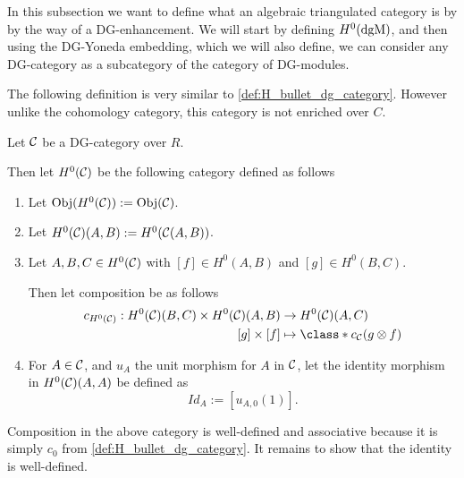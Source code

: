 In this subsection we want to define what an algebraic triangulated category is by by the way of a DG-enhancement. We will start by defining \( H^0(\operatorname{dgM}) \), and then using the DG-Yoneda embedding, which we will also define, we can consider any DG-category as a subcategory of the category of DG-modules.

The following definition is very similar to \autoref{def:H_bullet_dg_category}. However unlike the cohomology category, this category is not enriched over \( C \).

\begin{definition}
    \label{def:0_th_cohomology_of_dg_cat}
    Let \( {\mathcal{C}} \) be a DG-category over \( R \).

    Then let \( H^0({\mathcal{C}}) \) be the following category defined as follows
    \begin{enumerate}
        \item {
            Let \( \operatorname{Obj}(H^0({\mathcal{C}})) := \operatorname{Obj}({\mathcal{C}}) \).
        }
        \item {
            Let \( H^0({\mathcal{C}})(A, B) := H^0({\mathcal{C}}(A, B)) \).
        }
        \item {
            Let \( A, B, C \in H^0({\mathcal{C}}) \) with \( [f] \in H^0(A, B) \) and \( [g] \in H^0(B, C) \).

            Then let composition be as follows
            \begin{align*}
                c_{H^0(\Cc)}: H^0(\Cc)(B, C) \times H^0(\Cc)(A, B) &\to H^0(\Cc)(A, C) \\
                [g] \times [f] &\mapsto \class*{ c_{\Cc}(g \otimes f) }
            \end{align*}
        }
        \item {
            For \( A \in {\mathcal{C}} \), and \( u_A \) the unit morphism for \( A \) in \( {\mathcal{C}} \), let the identity morphism in \( H^0({\mathcal{C}})(A, A) \) be defined as
            \[
                Id_A := [u_{A, 0} (1)].
            \]
        }
    \end{enumerate}
\end{definition}

Composition in the above category is well-defined and associative because it is simply \( c_0 \) from \autoref{def:H_bullet_dg_category}. It remains to show that the identity is well-defined.

